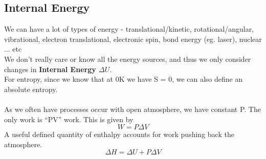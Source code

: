 \documentclass[10pt, twocolumn]{report}
\begin{document}
     \subsection{Internal Energy}
     We can have a lot of types of energy - translational/kinetic, rotational/angular, vibrational, electron translational, electronic spin, bond energy (eg. laser), nuclear ... etc\\We don't really care or know all the energy sources, and thus we only consider changes in \textbf{Internal Energy $\Delta U$}.\\ For entropy, since we know that at 0K we have S = 0, we can also define an absolute entropy.\\\\ As we often have processes occur with open atmosphere, we have constant P. The only work is ``PV'' work. This is given by $$W = P\Delta V$$A useful defined quantity of enthalpy accounts for work pushing back the atmosphere. $$\Delta H = \Delta U + P \Delta V$$\\
\end{document}
